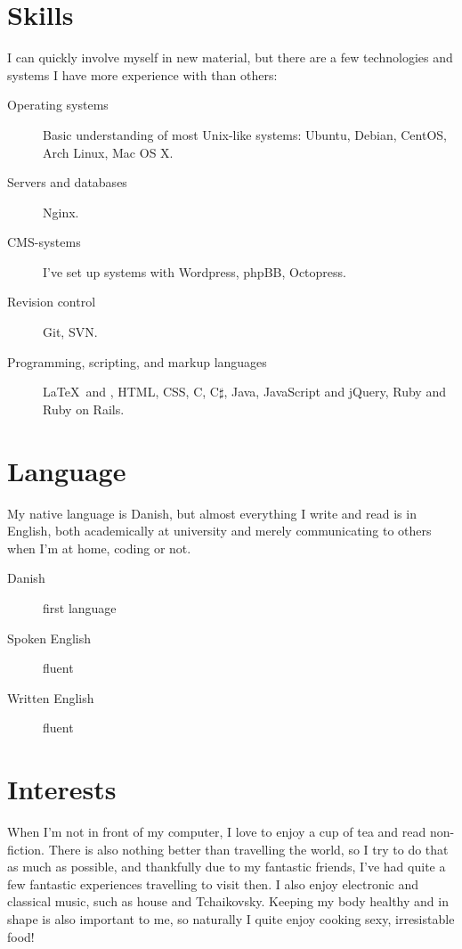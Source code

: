 \documentclass[margin,line,a4paper]{resume}
\begin{document}
\begin{resume}
\section{\mysidestyle Skills} \vspace{1mm}
I can quickly involve myself in new material, but there are a few
technologies and systems I have more experience with than others:
\vspace{0.5cm}
\begin{description}
  \item[Operating systems] Basic understanding of most Unix-like
    systems: Ubuntu, Debian, CentOS, Arch Linux, Mac OS X.
  \item[Servers and databases] Nginx. 
  \item[CMS-systems] I've set up systems with Wordpress, phpBB,
    Octopress.
  \item[Revision control] Git, SVN.
  \item[Programming, scripting, and markup languages] \LaTeX\ and
    \XeTeX, HTML, CSS, C, C$\sharp$, Java, JavaScript and jQuery, Ruby
    and Ruby on Rails.
\end{description}

\section{\mysidestyle Language}
My native language is Danish, but almost everything I write and read is
in English, both academically at university and merely communicating to
others when I'm at home, coding or not.

\begin{description}
  \item[Danish] first language
  \item[Spoken English] fluent
  \item[Written English] fluent 
\end{description}

\section{\mysidestyle Interests}
When I'm not in front of my computer, I love to enjoy a cup of tea and read non-fiction. There is also nothing better than travelling the world, so I try to do that as much as possible, and thankfully due to my fantastic friends, I've had quite a few fantastic experiences travelling to visit then. I also enjoy electronic and classical music, such as house and Tchaikovsky. Keeping my body healthy and in shape is also important to me, so naturally I quite enjoy cooking sexy, irresistable food!
\end{resume}
\end{document}
